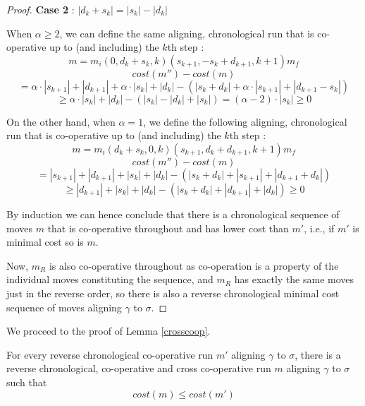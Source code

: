 \documentclass[runningheads]{llncs}
\begin{document}
\begin{proof}
\textbf{Case 2} : $|d_k + s_k| = |s_k| - |d_k|$

When $\alpha \geq 2$, we can define the same aligning, chronological run that is co-operative up to (and including) the $k$th step : 
$$m = m_i( 0,d_k + s_k,  k)( s_{k+1}, -s_k + d_{k+1}, k+1)m_f$$
$$cost(m'') - cost(m) $$$$= \alpha \cdot |s_{k+1}| + |d_{k+1}| + \alpha \cdot |s_k| + |d_k| - (|s_k + d_k | + \alpha \cdot| s_{k+1}| + | d_{k+1} - s_k |) $$
$$\geq \alpha \cdot |s_k| + |d_k| - (|s_k| - |d_k| + |s_k|) = (\alpha - 2)\cdot |s_k| \geq 0$$

On the other hand, when $\alpha = 1$, we define the following aligning, chronological run that is co-operative up to (and including) the $k$th step : 
$$m = m_i( d_k + s_k, 0, k)( s_{k+1}, d_k + d_{k+1}, k+1)m_f$$
$$cost(m'') - cost(m) $$$$= |s_{k+1}| + |d_{k+1}| + |s_k| + |d_k| - (|s_k + d_k | + | s_{k+1}| + | d_{k+1} + d_k |) $$
$$\geq |d_{k+1}| + |s_k| + |d_k| - (|s_k + d_k | + | d_{k+1}| + |d_k |) \geq 0$$

By induction we can hence conclude that there is a chronological sequence of moves $m$ that is co-operative throughout and has lower cost than $m'$, i.e., if $m'$ is minimal cost so is $m$.  

Now, $m_R$ is also co-operative throughout as co-operation is a property of the individual moves constituting the sequence, and $m_R$ has exactly the same moves just in the reverse order, so there is also a reverse chronological minimal cost sequence of moves aligning $\gamma$ to $\sigma$. 

\end{proof}

We proceed to the proof of Lemma \ref{crosscoop}. 

\begin{lemma*}	For every reverse chronological co-operative run $m'$ aligning $\gamma$ to $\sigma$, there is a reverse chronological, co-operative and cross co-operative run $m$ aligning $\gamma$ to $\sigma$ such that $$cost(m) \leq cost(m')$$
\end{lemma*}
\end{document}

